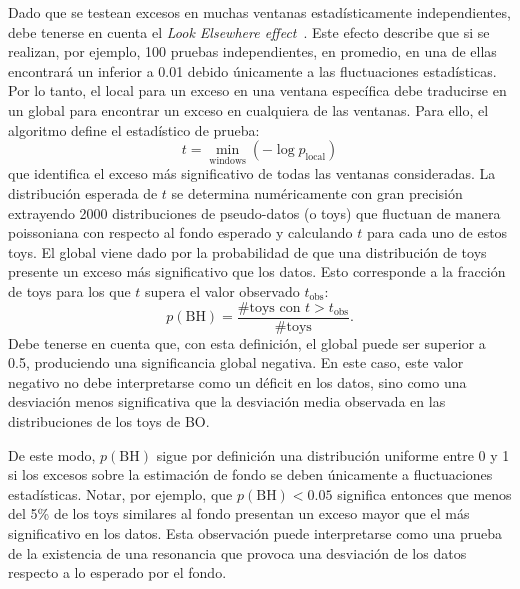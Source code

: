 Dado que se testean excesos en muchas ventanas estadísticamente independientes, debe tenerse en cuenta el \textit{Look Elsewhere effect}~\cite{LookElsewhereEffect}. Este efecto describe que si se realizan, por ejemplo, 100 pruebas independientes, en promedio, en una de ellas encontrará un \pval inferior a 0.01 debido únicamente a las fluctuaciones estadísticas. Por lo tanto, el \pval local para un exceso en una ventana específica debe traducirse en un \pval global para encontrar un exceso en cualquiera de las ventanas. Para ello, el algoritmo \bh define el estadístico de prueba:
\begin{equation}
    \label{eq:strategy:stat_treatment:bh:bh_statistic}
    t = \min_{\text{windows}} \left( - \log p_{\text{local}} \right)
\end{equation}
que identifica el exceso más significativo de todas las ventanas consideradas. La distribución esperada de \(t\) se determina numéricamente con gran precisión extrayendo 2000 distribuciones de pseudo-datos (o toys) que fluctuan de manera poissoniana con respecto al fondo esperado y calculando \(t\) para cada uno de estos toys. El \pval global viene dado por la probabilidad de que una distribución de toys presente un exceso más significativo que los datos. Esto corresponde a la fracción de toys para los que \(t\) supera el valor observado \(t_{\text{obs}}\):
\begin{equation}
    \label{eq:strategy:stat_treatment:bh:bh_pval}
    p(\text{BH}) = \frac{\text{\# toys con } t > t_{\text{obs}}}{\text{\# toys}}.
\end{equation}
Debe tenerse en cuenta que, con esta definición, el \pval global puede ser superior a 0.5, produciendo una significancia global negativa. En este caso, este valor negativo no debe interpretarse como un déficit en los datos, sino como una desviación menos significativa que la desviación media observada en las distribuciones de los toys de \ac{BO}.

De este modo, \(p(\text{BH})\) sigue por definición una distribución uniforme entre 0 y 1 si los excesos sobre la estimación de fondo se deben únicamente a fluctuaciones estadísticas. Notar, por ejemplo, que \(p(\text{BH}) < 0.05\) significa entonces que menos del 5\% de los toys similares al fondo presentan un exceso mayor que el más significativo en los datos. Esta observación puede interpretarse como una prueba de la existencia de una resonancia que provoca una desviación de los datos respecto a lo esperado por el fondo.